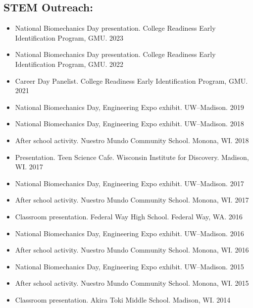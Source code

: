 \documentclass[letterpaper, 10pt]{article}
\begin{document}
\subsection{STEM Outreach:}
\begin{itemize}
    \item[] National Biomechanics Day presentation. College Readiness Early Identification Program, GMU. \hfill 2023
    \item[] National Biomechanics Day presentation. College Readiness Early Identification Program, GMU. \hfill 2022 %
    \item[] Career Day Panelist. College Readiness Early Identification Program, GMU. \hfill 2021 %
    \item[] National Biomechanics Day, Engineering Expo exhibit. UW--Madison. \hfill 2019 %
    \item[] National Biomechanics Day, Engineering Expo exhibit. UW--Madison. \hfill 2018 %
    \item[] After school activity. Nuestro Mundo Community School. Monona, WI. \hfill 2018
    \item[] Presentation. Teen Science Cafe. Wisconsin Institute for Discovery. Madison, WI. \hfill 2017 %
    \item[] National Biomechanics Day, Engineering Expo exhibit. UW--Madison. \hfill 2017 %
    \item[] After school activity. Nuestro Mundo Community School. Monona, WI. \hfill 2017
    \item[] Classroom presentation. Federal Way High School. Federal Way, WA. \hfill 2016 %
    \item[] National Biomechanics Day, Engineering Expo exhibit. UW--Madison. \hfill 2016 %
    \item[] After school activity. Nuestro Mundo Community School. Monona, WI. \hfill 2016
    \item[] National Biomechanics Day, Engineering Expo exhibit. UW--Madison. \hfill 2015 %
    \item[] After school activity. Nuestro Mundo Community School. Monona, WI. \hfill 2015
    \item[] Classroom presentation. Akira Toki Middle School. Madison, WI. \hfill 2014 %
\end{itemize}
\end{document}
